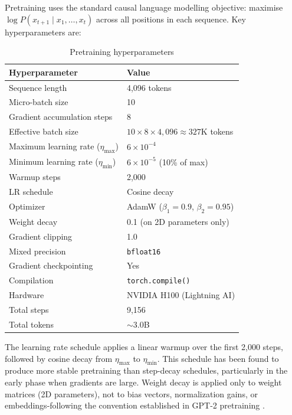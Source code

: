 \documentclass[12pt]{article}
\begin{document}
Pretraining uses the standard causal language modelling objective: maximise $\log P(x_{t+1} \mid x_1, \ldots, x_t)$ across all positions in each sequence. Key hyperparameters are:

\begin{table}[H]
  \centering
  \caption{Pretraining hyperparameters}
  \begin{tabular}{L{5.5cm} L{6.0cm}}
    \toprule
    \textbf{Hyperparameter} & \textbf{Value} \\
    \midrule
    Sequence length & 4,096 tokens \\
    Micro-batch size & 10 \\
    Gradient accumulation steps & 8 \\
    Effective batch size & $10 \times 8 \times 4{,}096 \approx 327$K tokens \\
    Maximum learning rate ($\eta_\text{max}$) & $6 \times 10^{-4}$ \\
    Minimum learning rate ($\eta_\text{min}$) & $6 \times 10^{-5}$ (10\% of max) \\
    Warmup steps & 2,000 \\
    LR schedule & Cosine decay \\
    Optimizer & AdamW \citep{loshchilov2019adamw} ($\beta_1=0.9$, $\beta_2=0.95$) \\
    Weight decay & 0.1 (on 2D parameters only) \\
    Gradient clipping & 1.0 \\
    Mixed precision & \texttt{bfloat16} \\
    Gradient checkpointing & Yes \\
    Compilation & \texttt{torch.compile()} \\
    Hardware & NVIDIA H100 (Lightning AI) \\
    Total steps & 9,156 \\
    Total tokens & $\sim$3.0B \\
    \bottomrule
  \end{tabular}
  \label{tab:pretrain_hparams}
\end{table}

The learning rate schedule applies a linear warmup over the first 2,000 steps, followed by cosine decay from $\eta_\text{max}$ to $\eta_\text{min}$. This schedule has been found to produce more stable pretraining than step-decay schedules, particularly in the early phase when gradients are large. Weight decay is applied only to weight matrices (2D parameters), not to bias vectors, normalization gains, or embeddings-following the convention established in GPT-2 pretraining \citep{radford2019language}.
\end{document}
